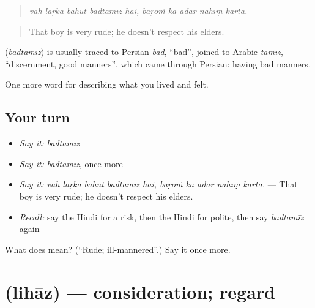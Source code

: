 \begin{quote}
\emph{vah laṛkā bahut badtamīz hai, baṛoṁ kā ādar nahīṃ kartā.}
\end{quote}

\begin{quote}
That boy is very rude; he doesn't respect his elders.
\end{quote}

\begin{cousinweb}
\textbf{} (\emph{badtamīz}) is usually traced to Persian \emph{bad}, \textquotedblleft{}bad\textquotedblright{}, joined to Arabic \emph{tamīz}, \textquotedblleft{}discernment, good manners\textquotedblright{}, which came through Persian: having bad manners.
\end{cousinweb}

\begin{grammarlens}[title={What you've built}]
One more word for describing what you lived and felt.
\end{grammarlens}

\subsection*{Your turn}
\begin{itemize}
\raggedright
  \item \emph{Say it:} \emph{badtamīz}
  \item \emph{Say it:} \emph{badtamīz}, once more
  \item \emph{Say it:} \emph{vah laṛkā bahut badtamīz hai, baṛoṁ kā ādar nahīṃ kartā.} — That boy is very rude; he doesn't respect his elders.
  \item \emph{Recall:} say the Hindi for a risk, then the Hindi for polite, then say \emph{badtamīz} again
\end{itemize}

\begin{tcolorbox}[breakable,colback=teal!4,colframe=teal!35!black,title={Before you move on}]
What does  mean? (\textquotedblleft{}Rude; ill-mannered\textquotedblright{}.) Say it once more.
\end{tcolorbox}
\section[\texorpdfstring{\hi{लिहाज़} (lihāz)}{लिहाज़ (lihāz)}]{ (lihāz) — consideration; regard}

\label{lesson:HI-C471-lihaz}



